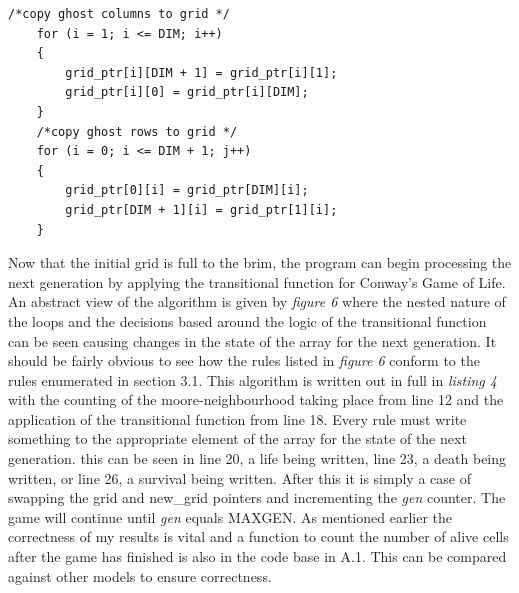 \documentclass[11pt]{article} %
\begin{document}
\begin{lstlisting}[caption = {Copying ghost cells}]
    /*copy ghost columns to grid */
    for (i = 1; i <= DIM; i++)
    {
        grid_ptr[i][DIM + 1] = grid_ptr[i][1];
        grid_ptr[i][0] = grid_ptr[i][DIM];
    }
    /*copy ghost rows to grid */
    for (i = 0; i <= DIM + 1; j++)
    {
        grid_ptr[0][i] = grid_ptr[DIM][i];
        grid_ptr[DIM + 1][i] = grid_ptr[1][i];
    }
\end{lstlisting}
Now that the initial grid is full to the brim, the program can begin processing the next generation by applying the transitional function for Conway's Game of Life. An abstract view of the algorithm is given by {\it figure 6} where the nested nature of the loops and the decisions based around the logic of the transitional function can be seen causing changes in the state of the array for the next generation. It should be fairly obvious to see how the rules listed in {\it figure 6} conform to the rules enumerated in section 3.1. This algorithm is written out in full in {\it listing 4} with the counting of the moore-neighbourhood taking place from line 12 and the application of the transitional function from line 18. Every rule must write something to the appropriate element of the array for the state of the next generation. this can be seen in line 20, a life being written, line 23, a death being written, or line 26, a survival being written. After this it is simply a case of swapping the grid and new\_grid pointers and incrementing the {\it gen} counter. The game will continue until {\it gen} equals MAXGEN. As mentioned earlier the correctness of my results is vital and a function to count the number of alive cells after the game has finished is also in the code base in A.1. This can be compared against other models to ensure correctness. 
\end{document}
